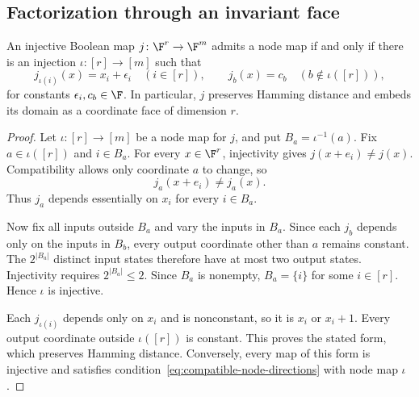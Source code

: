 \subsection{Factorization through an invariant face}

\begin{lemma}\label{lem:injective-node-map-form}
An injective Boolean map $j\colon\F^r\to\F^m$ admits a node map if and only if there is an injection $\iota\colon[r]\to[m]$ such that
\[
    j_{\iota(i)}(x)=x_i+\epsilon_i\quad(i\in[r]),
    \qquad
    j_b(x)=c_b\quad(b\notin\iota([r])),
\]
for constants $\epsilon_i,c_b\in\F$. In particular, $j$ preserves Hamming distance and embeds its domain as a coordinate face of dimension $r$.
\end{lemma}

\begin{proof}
Let $\iota\colon[r]\to[m]$ be a node map for $j$, and put $B_a=\iota^{-1}(a)$. Fix $a\in\iota([r])$ and $i\in B_a$. For every $x\in\F^r$, injectivity gives $j(x+e_i)\ne j(x)$. Compatibility allows only coordinate $a$ to change, so
\[
    j_a(x+e_i)\ne j_a(x).
\]
Thus $j_a$ depends essentially on $x_i$ for every $i\in B_a$.

Now fix all inputs outside $B_a$ and vary the inputs in $B_a$. Since each $j_b$ depends only on the inputs in $B_b$, every output coordinate other than $a$ remains constant. The $2^{|B_a|}$ distinct input states therefore have at most two output states. Injectivity requires $2^{|B_a|}\le2$. Since $B_a$ is nonempty, $B_a=\{i\}$ for some $i\in[r]$. Hence $\iota$ is injective.

Each $j_{\iota(i)}$ depends only on $x_i$ and is nonconstant, so it is $x_i$ or $x_i+1$. Every output coordinate outside $\iota([r])$ is constant. This proves the stated form, which preserves Hamming distance. Conversely, every map of this form is injective and satisfies condition~\eqref{eq:compatible-node-directions} with node map $\iota$.
\end{proof}

